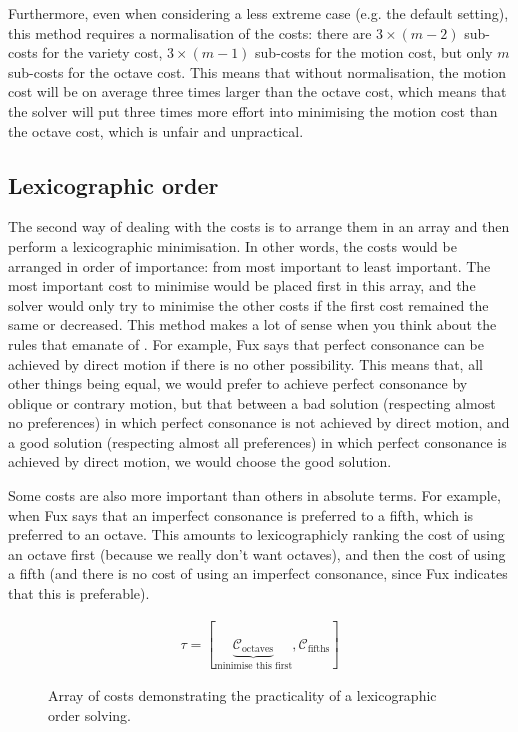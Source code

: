 Furthermore, even when considering a less extreme case (e.g. the default setting), this method requires a normalisation of the costs: there are $3\times (m-2)$ sub-costs for the variety cost, $3\times (m-1)$ sub-costs for the motion cost, but only $m$ sub-costs for the octave cost. This means that without normalisation, the motion cost will be on average three times larger than the octave cost, which means that the solver will put three times more effort into minimising the motion cost than the octave cost, which is unfair and unpractical.


\subsection{Lexicographic order}\label{section:lexicographic-order}
The second way of dealing with the costs is to arrange them in an array and then perform a lexicographic minimisation. In other words, the costs would be arranged in order of importance: from most important to least important. The most important cost to minimise would be placed first in this array, and the solver would only try to minimise the other costs if the first cost remained the same or decreased. This method makes a lot of sense when you think about the rules that emanate of \gap. For example, Fux says that perfect consonance can be achieved by direct motion if there is no other possibility. This means that, all other things being equal, we would prefer to achieve perfect consonance by oblique or contrary motion, but that between a bad solution (respecting almost no preferences) in which perfect consonance is not achieved by direct motion, and a good solution (respecting almost all preferences) in which perfect consonance is achieved by direct motion, we would choose the good solution. 

Some costs are also more important than others in absolute terms. For example, when Fux says that an imperfect consonance is preferred to a fifth, which is preferred to an octave. This amounts to lexicographicly ranking the cost of using an octave first (because we really don't want octaves), and then the cost of using a fifth (and there is no cost of using an imperfect consonance, since Fux indicates that this is preferable).
\begin{figure}[h]
    \begin{equation}
        \begin{aligned}
            \tau = [\underset{\text{minimise this first}}{\underbrace{\mathcal{C}_\text{octaves}}}, \mathcal{C}_\text{fifths}]
        \end{aligned}
    \end{equation}
    \caption{Array of costs demonstrating the practicality of a lexicographic order solving.}
\end{figure}

